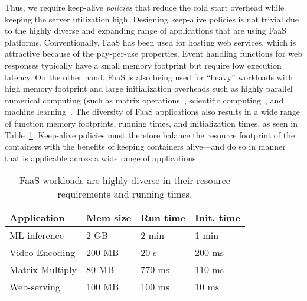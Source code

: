 Thus, we require keep-alive \emph{policies} that reduce the cold start overhead while keeping the server utilization high. 
Designing keep-alive policies is not trivial due to the highly diverse and expanding range of applications that are using FaaS platforms. 
Conventionally, FaaS has been used for hosting web services, which is attractive because of the pay-per-use properties. 
Event handling functions for web responses typically have a small memory footprint but require low execution latency. 
On the other hand, FaaS is also being used for ``heavy'' workloads with high memory footprint and large initialization overheads such as highly parallel numerical computing (such as matrix operations~\cite{jonas2017occupy}, scientific computing~\cite{shankar2018numpywren}, and machine learning~\cite{akkus_sand_2018}.
%
The diversity of FaaS applications also results in a wide range of function memory footprints, running times, and initialization times, as seen in Table~\ref{tab:workloads}. 
%
Keep-alive policies must therefore balance the resource footprint of the containers with the benefits of keeping containers alive---and do so in manner that is applicable across a wide range of applications. 


\begin{table}
  \label{tab:workloads}
  \begin{tabular}{llll}
    \hline 
    Application & Mem size & Run time & Init. time \\
    \hline
    ML inference & 2 GB & 2 min & 1 min \\
    Video Encoding & 200 MB & 20 s & 200 ms \\
    Matrix Multiply & 80 MB & 770 ms & 110 ms \\
    Web-serving & 100 MB & 100 ms & 10 ms \\

    \hline
  \end{tabular}
  \caption{FaaS workloads are highly diverse in their resource requirements and running times.} 
  \vspace*{\myfigspace}
  \vspace*{\myfigspace}
  \vspace*{\myfigspace}
\end{table}
















